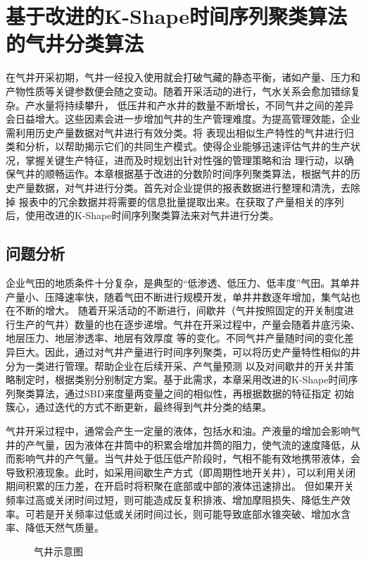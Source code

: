 \chapter{基于改进的K-Shape时间序列聚类算法的气井分类算法}
在气井开采初期，气井一经投入使用就会打破气藏的静态平衡，诸如产量、压力和产物性质等关键参数便会随之变动。随着开采活动的进行，气水关系会愈加错综复杂。产水量将持续攀升，
低压井和产水井的数量不断增长，不同气井之间的差异会日益增大。这些因素会进一步增加气井的生产管理难度。为提高管理效能，企业需利用历史产量数据对气井进行有效分类。将
表现出相似生产特性的气井进行归类和分析，以帮助揭示它们的共同生产模式。使得企业能够迅速评估气井的生产状况，掌握关键生产特征，进而及时规划出针对性强的管理策略和治
理行动，以确保气井的顺畅运作。本章根据基于改进的分数阶时间序列聚类算法，根据气井的历史产量数据，对气井进行分类。首先对企业提供的报表数据进行整理和清洗，去除掉
报表中的冗余数据并将需要的信息批量提取出来。在获取了产量相关的序列后，使用改进的K-Shape时间序列聚类算法来对气井进行分类。
\section{问题分析}
企业气田的地质条件十分复杂，是典型的“低渗透、低压力、低丰度”气田。其单井产量小、压降速率快，随着气田不断进行规模开发，单井井数逐年增加，集气站也在不断的增大。
随着开采活动的不断进行，间歇井（气井按照固定的开关制度进行生产的气井）数量的也在逐步递增。气井在开采过程中，产量会随着井底污染、地层压力、地层渗透率、地层有效厚度
等的变化。不同气井产量随时间的变化差异巨大。因此，通过对气井产量进行时间序列聚类，可以将历史产量特性相似的井分为一类进行管理。帮助企业在后续开采、产气量预测
以及对间歇井的开关井策略制定时，根据类别分别制定方案。基于此需求，本章采用改进的K-Shape时间序列聚类算法，通过SBD来度量两变量之间的相似性，再根据数据的特征指定
初始簇心，通过迭代的方式不断更新，最终得到气井分类的结果。

气井开采过程中，通常会产生一定量的液体，包括水和油。产液量的增加会影响气井的产气量，因为液体在井筒中的积累会增加井筒的阻力，使气流的速度降低，从而影响气井的产气量。当气井处于低压低产阶段时，气相不能有效地携带液体，会导致积液现象。此时，如采用间歇生产方式（即周期性地开关井），可以利用关闭期间积累的压力差，在开启时将积聚在底部或中部的液体迅速排出。
但如果开关频率过高或关闭时间过短，则可能造成反复积排液、增加摩阻损失、降低生产效率。可若是开关频率过低或关闭时间过长，则可能导致底部水锥突破、增加水含率、降低天然气质量。
\begin{figure}[H]
    \centering
    \caption{气井示意图}
\end{figure}
